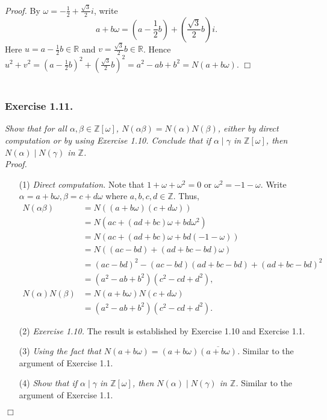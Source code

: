\documentclass{article}
\begin{document}
\emph{Proof.}
By $\omega = -\frac{1}{2}+\frac{\sqrt{3}}{2}i$,
write
$$a+b\omega
= \left( a - \frac{1}{2}b \right) + \left( \frac{\sqrt{3}}{2}b \right) i.$$
Here $u = a - \frac{1}{2}b \in \mathbb{R}$ and
$v = \frac{\sqrt{3}}{2}b \in \mathbb{R}$.
Hence $u^2+v^2 = (a - \frac{1}{2}b)^2 + (\frac{\sqrt{3}}{2}b)^2 = a^2 - ab + b^2
= N(a+b\omega)$.
$\Box$ \\\\






\subsubsection*{Exercise 1.11.}
\emph{Show that for all $\alpha, \beta \in \mathbb{Z}[\omega]$,
$N(\alpha\beta) = N(\alpha)N(\beta)$,
either by direct computation or by using Exercise 1.10.
Conclude that if $\alpha \mid \gamma$ in $\mathbb{Z}[\omega]$,
then $N(\alpha) \mid N(\gamma)$ in $\mathbb{Z}$.} \\

\emph{Proof.}
\begin{enumerate}
\item[(1)]
\emph{Direct computation.}
Note that $1+\omega+\omega^2 = 0$ or $\omega^2 = -1-\omega$.
Write $\alpha = a+b\omega, \beta=c+d\omega$ where $a, b, c, d \in \mathbb{Z}$.
Thus,
\begin{align*}
N(\alpha\beta)
&= N((a+b\omega)(c+d\omega)) \\
&= N(ac + (ad+bc)\omega + bd\omega^2) \\
&= N(ac + (ad+bc)\omega + bd(-1-\omega)) \\
&= N((ac-bd) + (ad+bc-bd)\omega) \\
&= (ac-bd)^2 - (ac-bd)(ad+bc-bd) + (ad+bc-bd)^2 \\
&= (a^2 - ab + b^2)(c^2 - cd + d^2), \\
N(\alpha)N(\beta)
&= N(a+b\omega) N(c+d\omega) \\
&= (a^2 - ab + b^2)(c^2 - cd + d^2).
\end{align*}
\item[(2)]
\emph{Exercise 1.10.}
The result is established by Exercise 1.10 and Exercise 1.1.
\item[(3)]
\emph{Using the fact that $N(a+b\omega) = (a+b\omega)\overline{(a+b\omega)}$.}
Similar to the argument of Exercise 1.1.
\item[(4)]
\emph{Show that if $\alpha \mid \gamma$ in $\mathbb{Z}[\omega]$,
then $N(\alpha) \mid N(\gamma)$ in $\mathbb{Z}$.}
Similar to the argument of Exercise 1.1.
\end{enumerate}
$\Box$ \\\\
\end{document}
